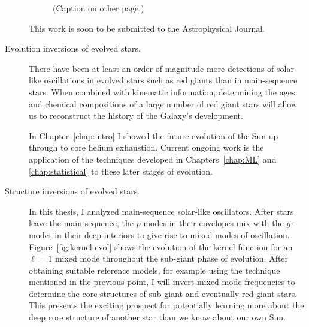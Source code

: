 \begin{description}
\begin{figure}
{    }%
    \caption[]{(Caption on other page.)
    \label{fig:phy2}}
\end{figure}
\begin{figure}
\end{figure}
    
    This work is soon to be submitted to the Astrophysical Journal. 
    
    
    \item[Evolution inversions of evolved stars.] 
    There have been at least an order of magnitude more detections of solar-like oscillations in evolved stars such as red giants than in main-sequence stars. 
    When combined with kinematic information, determining the ages and chemical compositions of a large number of red giant stars will allow us to reconstruct the history of the Galaxy's development.
    
    In Chapter~\ref{chap:intro} I showed the future evolution of the Sun up through to core helium exhaustion. 
    Current ongoing work is the application of the techniques developed in Chapters~\ref{chap:ML} and \ref{chap:statistical} to these later stages of evolution.  
    
    
    \item[Structure inversions of evolved stars.]
    In this thesis, I analyzed main-sequence solar-like oscillators. 
    After stars leave the main sequence, the $p$-modes in their envelopes mix with the $g$-modes in their deep interiors to give rise to mixed modes of oscillation. 
    Figure~\ref{fig:kernel-evol} shows the evolution of the kernel function for an ${\ell=1}$ mixed mode throughout the sub-giant phase of evolution. 
    After obtaining suitable reference models, for example using the technique mentioned in the previous point, I will invert mixed mode frequencies to determine the core structures of sub-giant and eventually red-giant stars. 
    This presents the exciting prospect for potentially learning more about the deep core structure of another star than we know about our own Sun. 


\end{description}
